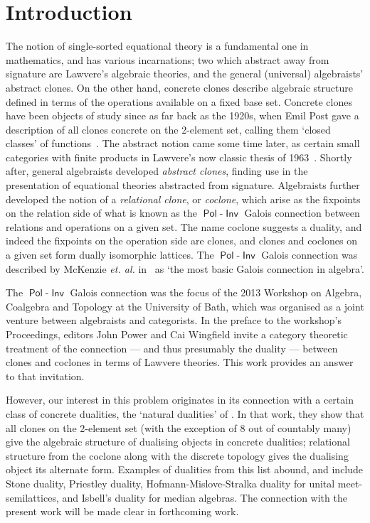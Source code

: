 \documentclass[11pt, a4paper, twoside,leqno]{amsart}
\numberwithin{equation}{section}
\theoremstyle{plain}
\theoremstyle{definition}
\DeclareMathOperator{\Pol}{\mathsf{Pol}}
\DeclareMathOperator{\Inv}{\mathsf{Inv}}
\begin{document}
\section{Introduction}
\label{sec:introduction}
The notion of
  single-sorted equational theory is a fundamental one in mathematics,
  and has various incarnations; two which abstract away from signature
  are Lawvere's algebraic theories, and the general (universal) algebraists'
  abstract clones. On the other hand, concrete clones describe
  algebraic structure defined in terms of the operations available on
  a fixed base set.
Concrete clones have been objects of study since as far back as the
1920s, when Emil Post gave a description of all clones concrete on the
2-element set, calling them `closed classes' of
functions~\cite{Kerkhoff:2014aa}. The abstract notion
came some time later, as certain small categories with
finite products in Lawvere's now classic thesis of
1963~\cite{Lawvere:1963aa}.
Shortly after, general algebraists developed \emph{abstract clones},
finding use in the presentation of equational
theories abstracted from signature.
Algebraists further developed the
notion of a \emph{relational clone}, or \emph{coclone}, which
arise as the fixpoints on the relation side of what is known as the
\(\Pol\)-\(\Inv\) Galois connection between relations and operations
on a given set. The name coclone suggests a duality, and indeed the fixpoints on the operation
side are clones, and clones and coclones on a given set form dually
isomorphic lattices. The
\(\Pol\)-\(\Inv\) Galois connection was described by McKenzie {\it et. al.} in~\cite{McKenzie:1987aa}
as `the most
basic Galois connection in algebra'.


The \(\Pol\)-\(\Inv\) Galois
connection was the focus of the 2013 Workshop on Algebra, Coalgebra and Topology at the
University of Bath, which was organised
as a joint venture between algebraists and categorists.
In the preface to the workshop's Proceedings,
editors John Power and Cai Wingfield invite a category theoretic treatment
of the connection --- and thus presumably the duality --- between clones and coclones in terms of Lawvere
theories.  This work provides an answer to that invitation.


However, our interest in this problem originates in its connection
with a certain class of concrete dualities, the `natural dualities' of
\cite{Clark:1998aa}. %
In that work, they show that all clones on the 2-element set (with the exception
of 8 out of countably many) give the algebraic structure
of dualising objects in concrete dualities; relational structure
from the coclone along with the discrete topology gives the dualising
object its alternate form. Examples of dualities from this list
abound, and include Stone duality, Priestley
duality, Hofmann-Mislove-Stralka duality for unital meet-semilattices,
and Isbell's duality for median algebras. The connection with the
present work will be made clear in forthcoming
work. 
\end{document}
